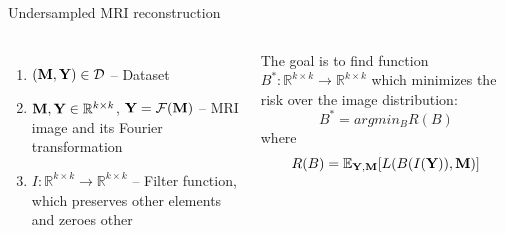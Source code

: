 \documentclass{beamer}
\begin{document}
\begin{frame}{Undersampled MRI reconstruction}
\begin{columns}[c]
\begin{enumerate}
    \item $(\textbf M, \textbf Y) \in \mathcal{D}$ -- Dataset
    \item $\textbf M, \textbf Y \in \mathbb{R}^{k \times k}$, $\textbf Y=\mathcal{F}(\textbf M)$ -- MRI image and its Fourier transformation
    \item $I: \mathbb{R}^{k \times k} \longrightarrow \mathbb{R}^{k \times k}$ -- Filter function, which preserves other elements and zeroes other
\end{enumerate}
The goal is to find function $B^*: \mathbb{R}^{k \times k} \longrightarrow \mathbb{R}^{k \times k}$ which minimizes the risk over the image distribution:
\[B^* = argmin_B R(B)\] where
 \[ R(B)= \mathbb{E}_{\textbf Y, \textbf M}[L(B(I(\textbf Y)), \textbf M)]\]
\end{columns}
%
\end{frame}


\end{document}
